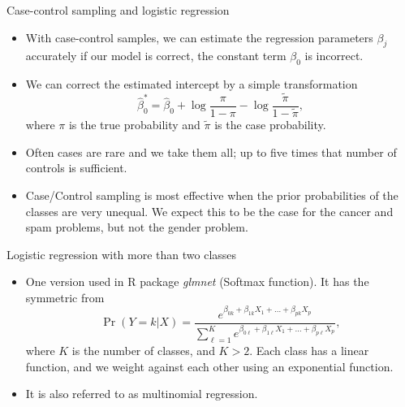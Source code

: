 \documentclass[11pt, a4paper]{article}
\begin{document}
Case-control sampling and logistic regression
\begin{itemize}
  \item With case-control samples, we can estimate the regression parameters $\beta_j$ accurately if our model is correct, the constant term $\beta_0$ is incorrect.
  \item We can correct the estimated intercept by a simple transformation
  \[
    \hat{\beta}_0^*=\hat{\beta}_0+\log{\frac{\pi}{1-\pi}}-\log{\frac{\tilde{\pi}}{1-\tilde{\pi}}},
  \]
  where $\pi$ is the true probability and $\tilde{\pi}$ is the case probability.
  \item Often cases are rare and we take them all; up to five times that number of controls is sufficient.
  \item Case/Control sampling is most effective when the prior probabilities of the classes are very unequal. We expect this to be the case for the cancer and spam problems, but not the gender problem.
\end{itemize}
Logistic regression with more than two classes
\begin{itemize}
  \item One version used in R package \emph{glmnet} (Softmax function). It has the symmetric from
  \[
    \operatorname{Pr}(Y=k|X)=\frac{e^{\beta_{0k}+\beta_{1k}X_1+\dots+\beta_{pk}X_p}}{\sum_{\ell=1}^Ke^{\beta_{0\ell}+\beta_{1\ell}X_1+\dots+\beta_{p\ell}X_p}},
  \]
  where $K$ is the number of classes, and $K>2$. Each class has a linear function, and we weight against each other using an exponential function.
\item It is also referred to as multinomial regression.
\end{itemize}
\end{document}
